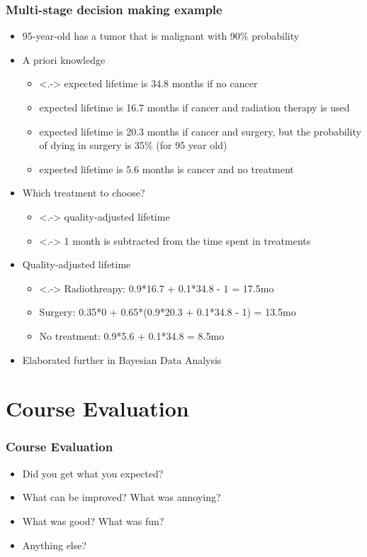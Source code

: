 \documentclass[10pt]{beamer}
\begin{document}
\begin{frame}
\frametitle{Multi-stage decision making example}

  \begin{itemize}
  \item 95-year-old has a tumor that is malignant with 90\% probability
  \item A priori knowledge
    \begin{itemize}
    \item<.-> expected lifetime is 34.8 months if no cancer
    \item<+-> expected lifetime is 16.7 months if cancer and radiation therapy is used
    \item<+-> expected lifetime is 20.3 months if cancer and surgery, but the probability of dying in surgery is 35\% (for 95 year old)
    \item<+-> expected lifetime is 5.6 months is cancer and no treatment
    \end{itemize}
  \item<+-> Which treatment to choose?
    \begin{itemize}
    \item<.-> quality-adjusted lifetime
    \item<.-> 1 month is subtracted from the time spent in treatments
    \end{itemize}
   \item<+-> Quality-adjusted lifetime
    \begin{itemize}
    \item<.-> Radiothreapy: 0.9*16.7 + 0.1*34.8 - 1 = 17.5mo
    \item<+-> Surgery: 0.35*0 + 0.65*(0.9*20.3 + 0.1*34.8 - 1) = 13.5mo
    \item<+-> No treatment: 0.9*5.6 + 0.1*34.8 = 8.5mo
    \end{itemize}
  \item<+-> Elaborated further in Bayesian Data Analysis
\end{itemize}

\end{frame}


\section{Course Evaluation}
\frame{\sectionpage}

\begin{frame}

\frametitle{Course Evaluation}

\begin{itemize}
\item Did you get what you expected?
\pause
\item What can be improved? What was annoying?
\pause
\item What was good? What was fun?
\pause
\item Anything else?
\end{itemize}

\end{frame}


\end{document}
